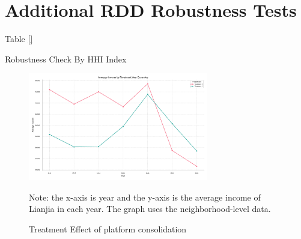 \documentclass[11pt]{article}
\begin{document}
\clearpage

\section{Additional RDD Robustness Tests} \label{sec:additional_rdd}
% 

Table \ref{}






\clearpage

\begin{table}[H]
  \begin{center}
    \begin{scriptsize}
    \caption{Robustness Check By HHI Index}
    \label{tab:dynamic_hhi}
      
  
    \end{scriptsize}
  \end{center}
\end{table}

\clearpage

%       
  

\begin{figure}[H]
    \centering
    \includegraphics[width=0.7\textwidth]{../figures/average_income_by_treatment_platform.pdf}
    \caption{Treatment Effect of platform consolidation}
    \label{fig:treatment_consolidation}
    Note: the x-axis is year and the y-axis is the average income of Lianjia in each year. The graph uses the neighborhood-level data.
\end{figure}
\end{document}

